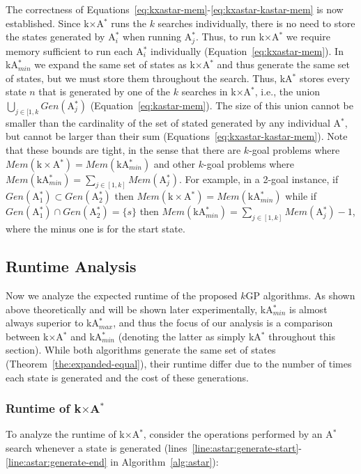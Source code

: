 \documentclass{aicom2e}
\newcommand{\kgs}{$k$GP}
\newcommand{\astar}{A$^*$}
\newcommand{\kastar}{kA$^*$}
\newcommand{\kastarmin}{kA$^*_{min}$}
\newcommand{\kastarmax}{kA$^*_{max}$}
\newcommand{\kxastar}{k$\times$A$^*$}
\newcommand{\astari}[1]{A$^*_#1$}
\begin{document}
The correctness of Equations~\ref{eq:kxastar-mem}-\ref{eq:kxastar-kastar-mem}
is now established. Since \kxastar{} runs the $k$ searches individually, there
is no need to store the states generated by \astari{i} when running \astari{j}.
Thus, to run \kxastar{} we require memory sufficient to run each \astari{i}
individually (Equation~\ref{eq:kxastar-mem}). In \kastarmin{} we expand the
same set of states as \kxastar{} and thus generate the same set of states, but
we must store them throughout the search. Thus, \kastar{} stores every state
$n$ that is  generated by one of the $k$ searches in \kxastar{}, i.e., the
union $\bigcup_{j\in[1,k}Gen(\text{\astari{j}})$
(Equation~\ref{eq:kastar-mem}). The size of this union cannot be smaller than
the cardinality of the set of stated generated by any individual \astar{}, but
cannot be larger than their sum (Equations~\ref{eq:kxastar-kastar-mem}). Note
that these bounds are tight, in the sense that there are $k$-goal problems
where $Mem(\text{\kxastar{}}) = Mem(\text{\kastarmin{}})$ and other $k$-goal
problems where $Mem(\text{\kastarmin{}}) = \sum_{j\in[1,k]}
Mem(\text{\astari{j}})$. For example, in a 2-goal instance, if
$Gen(\text{\astari{1}})\subset Gen(\text{\astari{2}})$ then
$Mem(\text{\kxastar{}}) = Mem(\text{\kastarmin{}})$ while if
$Gen(\text{\astari{1}})\cap Gen(\text{\astari{2}})=\{s\}$ then
$Mem(\text{\kastarmin{}}) = \sum_{j\in[1,k]} Mem(\text{\astari{j}})-1$, 
where the minus one is for the start state. %

\subsection{Runtime Analysis}

Now we analyze the expected runtime of the proposed \kgs{} algorithms. As shown
above theoretically and will be shown later experimentally, \kastarmin{} is
almost always superior to \kastarmax{}, and thus the focus of our analysis is a
comparison between \kxastar{} and \kastarmin{} (denoting the latter as simply
\kastar{} throughout this section).  While both algorithms generate the same
set of states (Theorem~\ref{the:expanded-equal}), their runtime differ due to the number of times each state is
generated and the cost of these generations.



\subsubsection{Runtime of \kxastar{}}
To analyze the runtime of \kxastar{}, consider the operations performed by an \astar{} search whenever a state is generated (lines~\ref{line:astar:generate-start}-\ref{line:astar:generate-end} in
Algorithm~\ref{alg:astar}):
\end{document}
